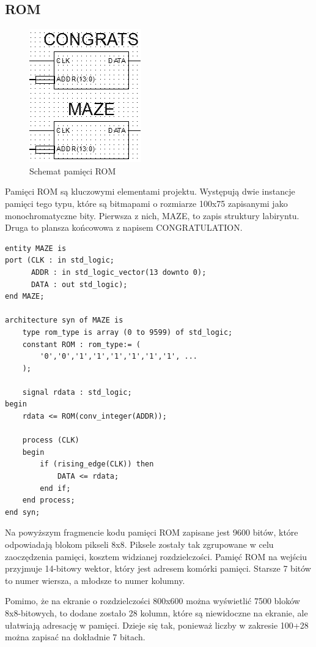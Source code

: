 \documentclass[11pt]{article}
\begin{document}
\subsection{ROM}

\begin{figure}[H]
\center
\includegraphics[scale=1]{ROM.png} 
\caption{Schemat pamięci ROM}
\end{figure}

Pamięci ROM są kluczowymi elementami projektu. Występują dwie instancje pamięci tego typu, które są bitmapami o rozmiarze 100x75 zapisanymi jako monochromatyczne bity.
Pierwsza z nich, MAZE, to zapis struktury labiryntu.
Druga to plansza końcowowa z napisem CONGRATULATION.

\begin{lstlisting}[caption=Kod pamięci ROM]
entity MAZE is
port (CLK : in std_logic;
      ADDR : in std_logic_vector(13 downto 0);
      DATA : out std_logic);
end MAZE;

architecture syn of MAZE is
    type rom_type is array (0 to 9599) of std_logic;
    constant ROM : rom_type:= (
        '0','0','1','1','1','1','1','1', ...
    );

    signal rdata : std_logic;
begin
    rdata <= ROM(conv_integer(ADDR));

    process (CLK)
    begin
        if (rising_edge(CLK)) then
            DATA <= rdata;
        end if;
    end process;
end syn;
\end{lstlisting}

Na powyższym fragmencie kodu pamięci ROM zapisane jest 9600 bitów, które odpowiadają blokom pikseli 8x8.
Piksele zostały tak zgrupowane w celu zaoczędzenia pamięci, kosztem widzianej rozdzielczości.
Pamięć ROM na wejściu przyjmuje 14-bitowy wektor, który jest adresem komórki pamięci.
Starsze 7 bitów to numer wiersza, a młodsze to numer kolumny.

Pomimo, że na ekranie o rozdzielczości 800x600 można wyświetlić 7500 bloków 8x8-bitowych, to dodane zostało 28 kolumn, które są niewidoczne na ekranie, ale ułatwiają adresację w pamięci.
Dzieje się tak, ponieważ liczby w zakresie 100+28 można zapisać na dokładnie 7 bitach.
\end{document}
